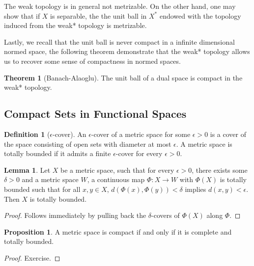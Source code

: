 \documentclass[]{article}
\theoremstyle{definition}
\newtheorem{theorem}{Theorem}
\theoremstyle{definition}
\newtheorem{definition}{Definition}[section]
\newtheorem{lemma}{Lemma}[section]
\newtheorem{proposition}{Proposition}[section]
\begin{document}
The weak topology is in general not metrizable. On the other hand, one 
may show that if \(X\) is separable, the the unit ball in \(X^*\) endowed 
with the topology induced from the weak* topology is metrizable.

Lastly, we recall that the unit ball is never compact in a infinite dimensional 
normed space, the following theorem demonstrate that the weak* topology allows 
us to recover some sense of compactness in normed spaces.

\begin{theorem}[Banach-Alaoglu]
  The unit ball of a dual space is compact in the weak* topology.
\end{theorem}

\subsection{Compact Sets in Functional Spaces}

\begin{definition}[\(\epsilon\)-cover]
  An \(\epsilon\)-cover of a metric space for some \(\epsilon > 0\) is a cover 
  of the space consisting of open sets with diameter at most \(\epsilon\). 
  A metric space is totally bounded if it admits a finite \(\epsilon\)-cover 
  for every \(\epsilon > 0\).
\end{definition}

\begin{lemma}\label{tb}
  Let \(X\) be a metric space, such that for every \(\epsilon > 0\), there 
  exists some \(\delta > 0\) and a metric space \(W\), a continuous map 
  \(\Phi : X \to W\) with \(\Phi(X)\) is totally bounded such that for all 
  \(x, y \in X\), \(d(\Phi(x), \Phi(y)) < \delta\) implies 
  \(d(x, y) < \epsilon\). Then \(X\) is totally bounded. 
\end{lemma}
\begin{proof}
  Follows immediately by pulling back the \(\delta\)-covers of \(\Phi(X)\) along 
  \(\Phi\). 
\end{proof}

\begin{proposition}
  A metric space is compact if and only if it is complete and totally bounded.
\end{proposition}
\begin{proof}
  Exercise.
\end{proof}
\end{document}
